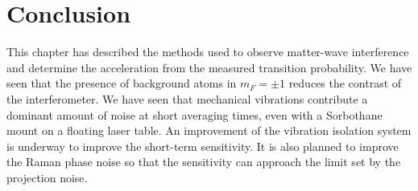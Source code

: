 \section{Conclusion}
This chapter has described the methods used to observe matter-wave
interference and determine the acceleration from the measured transition
probability. We have seen that the presence of background atoms in $m_F = \pm 1$
reduces the contrast of the interferometer. We have seen that
mechanical vibrations contribute a dominant amount of noise at short
averaging times, even with
a Sorbothane mount on a floating laser table. An improvement of the vibration
isolation system is underway to improve the
short-term sensitivity. It is also planned to improve the Raman phase noise so that the sensitivity can approach the limit set by the
projection noise.
